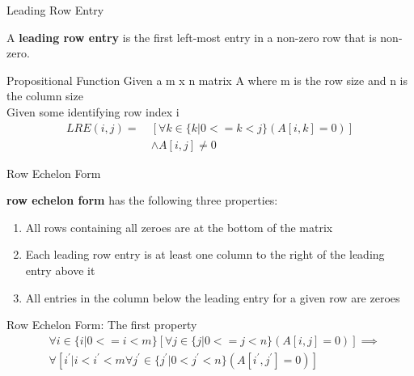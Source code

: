 \documentclass{beamer}
\begin{document}
\begin{frame}{Leading Row Entry}
\begin{definition}
A \textbf{leading row entry} is the first left-most entry in a non-zero row that is non-zero.
\end{definition}
\begin{block}{Propositional Function}
Given a m x n matrix A where m is the row size and n is the column size \\
Given some identifying row index i \\ 
\begin{equation}
\begin{split}
LRE(i, j) = \ &\left[\forall k \in \{ k | 0 <= k < j \}\left(A\left[i, k\right] = 0\right)\right] \\
            \ &\land A\left[i, j\right] \neq 0
\end{split}
\end{equation}
\end{block}
\end{frame}

\begin{frame}{Row Echelon Form}
\begin{definition}
\textbf{row echelon form} has the following three properties:
\begin{enumerate}
\item All rows containing all zeroes are at the bottom of the matrix
\item Each leading row entry is at least one column to the right of the leading entry above it
\item All entries in the column below the leading entry for a given row are zeroes
\end{enumerate}
\end{definition}
\end{frame}


\begin{frame}{Row Echelon Form: The first property}
\begin{equation}
\begin{split}
&\forall i \in \{i | 0 <= i < m\}\left[\forall j \in \{j | 0 <= j < n \}\left( A[i, j] = 0\right)\right] \implies \\ 
&\forall \left[{i^{\prime} | i < i^{\prime} < m} \forall j^{\prime} \in \{ j^{\prime} | 0 < j^{\prime} < n \}\left(A[i^{\prime}, j^{\prime}] = 0\right)\right]
\end{split}
\end{equation}
\end{frame}
\end{document}
